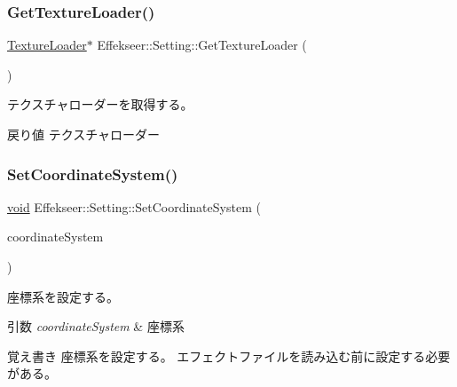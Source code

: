 \subsubsection{\texorpdfstring{Get\+Texture\+Loader()}{GetTextureLoader()}}
{\footnotesize\ttfamily \mbox{\hyperlink{class_effekseer_1_1_texture_loader}{Texture\+Loader}}$\ast$ Effekseer\+::\+Setting\+::\+Get\+Texture\+Loader (\begin{DoxyParamCaption}{ }\end{DoxyParamCaption})}



テクスチャローダーを取得する。 

\begin{DoxyReturn}{戻り値}
テクスチャローダー 
\end{DoxyReturn}
\mbox{\label{class_effekseer_1_1_setting_ab252bfe6bd18b3fafafae0e37351df72}} 
\subsubsection{\texorpdfstring{Set\+Coordinate\+System()}{SetCoordinateSystem()}}
{\footnotesize\ttfamily \mbox{\hyperlink{namespace_effekseer_ab34c4088e512200cf4c2716f168deb56}{void}} Effekseer\+::\+Setting\+::\+Set\+Coordinate\+System (\begin{DoxyParamCaption}\item[{\mbox{\hyperlink{namespace_effekseer_ac8508f8823c5fcf36aac5d2ddee23765}{Coordinate\+System}}}]{coordinate\+System }\end{DoxyParamCaption})}



座標系を設定する。 


\begin{DoxyParams}{引数}
{\em coordinate\+System} & 座標系 \\
\hline
\end{DoxyParams}
\begin{DoxyNote}{覚え書き}
座標系を設定する。 エフェクトファイルを読み込む前に設定する必要がある。 
\end{DoxyNote}
\mbox{\label{class_effekseer_1_1_setting_acc38b8b4013c440242f1bba9a9696639}} 
